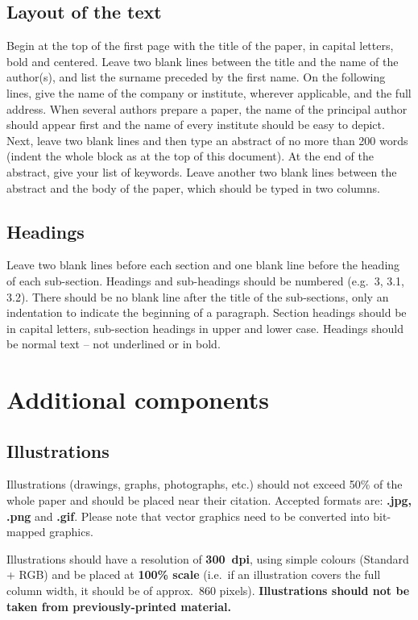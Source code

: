 \documentclass{eupvsec}
\begin{document}
\subsection{Layout of the text}

Begin at the top of the first page with the title of the paper, in
capital letters, bold and centered. Leave two blank lines between the
title and the name of the author(s), and list the surname preceded by
the first name. On the following lines, give the name of the company
or institute, wherever applicable, and the full address. When several
authors prepare a paper, the name of the principal author should
appear first and the name of every institute should be easy to depict.
Next, leave two blank lines and then type an abstract of no more than
200 words (indent the whole block as at the top of this document). At
the end of the abstract, give your list of keywords. Leave another two
blank lines between the abstract and the body of the paper, which
should be typed in two columns.

\subsection{Headings}

Leave two blank lines before each section and one blank line before
the heading of each sub-section. Headings and sub-headings should be
numbered (e.g.\ 3, 3.1, 3.2). There should be no blank line after the
title of the sub-sections, only an indentation to indicate the
beginning of a paragraph. Section headings should be in capital
letters, sub-section headings in upper and lower case. Headings should
be normal text -- not underlined or in bold.

\section{Additional components}

\subsection{Illustrations}

Illustrations (drawings, graphs, photographs, etc.) should not exceed
50\% of the whole paper and should be placed near their citation.
Accepted formats are: \textbf{.jpg, .png} and \textbf{.gif}. Please
note that vector graphics need to be converted into bit-mapped
graphics.

Illustrations should have a resolution of \textbf{300~dpi}, using
simple colours (Standard + RGB) and be placed at \textbf{100\% scale}
(i.e.\ if an illustration covers the full column width, it should be
of approx.\ 860 pixels). \textbf{Illustrations should not be taken
from previously-printed material.}
\end{document}
